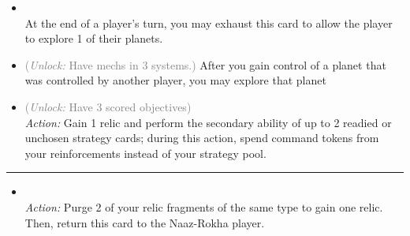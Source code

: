 \begin{multicols}{2}
\begin{itemize}
\item {}\\
At the end of a player's turn, you may exhaust this card to allow the player to explore 1 of their planets.
\item {} \textcolor{gray}{(\emph{Unlock:} Have mechs in 3 systems.)} 
After you gain control of a planet that was controlled by another player, you may explore that planet
\item {} \textcolor{gray}{(\emph{Unlock:} Have 3 scored objectives)}\\
\emph{Action:} Gain 1 relic and perform the secondary ability of up to 2 readied or unchosen strategy cards; during this action, spend command tokens from your reinforcements instead of your strategy pool. 
\end{itemize}

\vspace{-10pt}\rule{\hsize}{0.4pt}\vspace{5pt}


\begin{itemize}
\item {}\\
\emph{Action:} Purge 2 of your relic fragments of the same type to gain one relic. Then, return this card to the Naaz-Rokha player.
\end{itemize}

\end{multicols}



